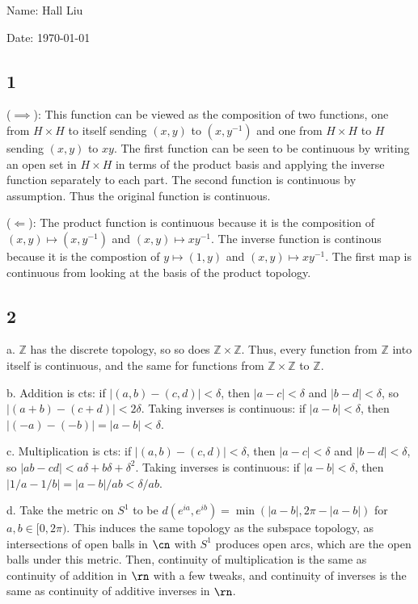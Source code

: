 \documentclass{article}
\begin{document}
Name: Hall Liu

Date: \today 
\vspace{0.5cm}

\subsection*{1}
($\implies$): This function can be viewed as the composition of two functions, one from $H\times H$ to itself sending $(x,y)$ to $(x,y^{-1})$ and one from $H\times H$ to $H$ sending $(x,y)$ to $xy$. The first function can be seen to be continuous by writing an open set in $H\times H$ in terms of the product basis and applying the inverse function separately to each part. The second function is continuous by assumption. Thus the original function is continuous.

($\Leftarrow$): The product function is continuous because it is the composition of $(x,y)\mapsto(x,y^{-1})$ and $(x,y)\mapsto xy^{-1}$. The inverse function is continous because it is the compostion of $y\mapsto(1,y)$ and $(x,y)\mapsto xy^{-1}$. The first map is continuous from looking at the basis of the product topology.
\subsection*{2}
a. $\mathbb{Z}$ has the discrete topology, so so does $\mathbb{Z}\times\mathbb{Z}$. Thus, every function from $\mathbb{Z}$ into itself is continuous, and the same for functions from $\mathbb{Z}\times\mathbb{Z}$ to $\mathbb{Z}$.

b. Addition is cts: if $|(a,b)-(c,d)|<\delta$, then $|a-c|<\delta$ and $|b-d|<\delta$, so $|(a+b)-(c+d)|<2\delta$. Taking inverses is continuous: if $|a-b|<\delta$, then $|(-a)-(-b)|=|a-b|<\delta$.

c. Multiplication is cts: if $|(a,b)-(c,d)|<\delta$, then $|a-c|<\delta$ and $|b-d|<\delta$, so $|ab-cd|<a\delta+b\delta+\delta^2$. Taking inverses is continuous: if $|a-b|<\delta$, then $|1/a-1/b|=|a-b|/ab<\delta/ab$.

d. Take the metric on $S^1$ to be $d(e^{ia},e^{ib})=\min(|a-b|,2\pi-|a-b|)$ for $a,b\in[0,2\pi)$. This induces the same topology as the subspace topology, as intersections of open balls in $\cn$ with $S^1$ produces open arcs, which are the open balls under this metric. Then, continuity of multiplication is the same as continuity of addition in $\rn$ with a few tweaks, and continuity of inverses is the same as continuity of additive inverses in $\rn$.
\end{document}
